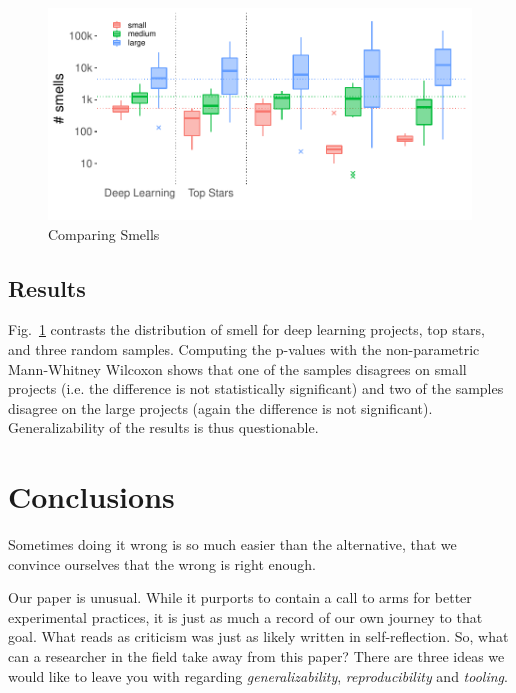 \documentclass[sigconf,review,anonymous]{acmart}
\begin{document}
\begin{figure}[th]
  \includegraphics[width=1.03\columnwidth]{../figs/scent-dl/smell_frequencies}
  \caption{Comparing Smells}\label{fig:smell_frequencies}
\end{figure}


\subsection*{Results}

Fig.~\ref{fig:smell_frequencies} contrasts the distribution of smell for deep
learning projects, top stars, and three random samples. Computing the p-values
with the non-parametric Mann-Whitney Wilcoxon shows that one of the samples
disagrees on small projects (i.e. the difference is not statistically
significant) and two of the samples disagree on the large projects (again the
difference is not significant). Generalizability of the results is thus
questionable.

\section{Conclusions}

Sometimes doing it wrong is so much easier than the alternative, that we
convince ourselves that the wrong is right enough.

Our paper is unusual. While it purports to contain a call to arms for better
experimental practices, it is just as much a record of our own journey to that
goal. What reads as criticism was just as likely written in self-reflection. So,
what can a researcher in the field take away from this paper? There are three
ideas we would like to leave you with regarding \emph{generalizability},
\emph{reproducibility} and \emph{tooling}.
\end{document}
